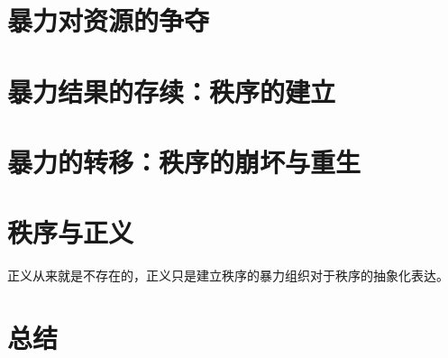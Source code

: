 \section{暴力对资源的争夺}
\section{暴力结果的存续：秩序的建立}
\section{暴力的转移：秩序的崩坏与重生}
\section{秩序与正义}
正义从来就是不存在的，正义只是建立秩序的暴力组织对于秩序的抽象化表达。
\section{总结}